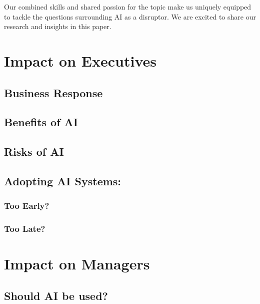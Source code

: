 \documentclass[
]{book}
\begin{document}
Our combined skills and shared passion for the topic make us uniquely equipped to tackle the questions surrounding AI as a disruptor. We are excited to share our research and insights in this paper.

\hypertarget{impact-on-executives}{%
\chapter{Impact on Executives}\label{impact-on-executives}}

\hypertarget{business-response}{%
\section{Business Response}\label{business-response}}

\hypertarget{benefits-of-ai}{%
\section{Benefits of AI}\label{benefits-of-ai}}

\hypertarget{risks-of-ai}{%
\section{Risks of AI}\label{risks-of-ai}}

\hypertarget{adopting-ai-systems}{%
\section{Adopting AI Systems:}\label{adopting-ai-systems}}

\hypertarget{too-early}{%
\subsection{Too Early?}\label{too-early}}

\hypertarget{too-late}{%
\subsection{Too Late?}\label{too-late}}

\hypertarget{impact-on-managers}{%
\chapter{Impact on Managers}\label{impact-on-managers}}

\hypertarget{should-ai-be-used}{%
\section{Should AI be used?}\label{should-ai-be-used}}
\end{document}
